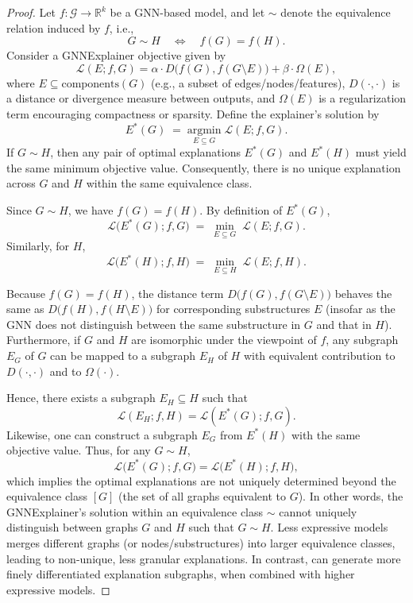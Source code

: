 \begin{proof}
Let $f : \mathcal{G} \to \mathbb{R}^k$ be a GNN-based model, and let $\sim$ denote the equivalence relation induced by $f$, i.e.,
\[
G \sim H \quad \Longleftrightarrow \quad f(G) = f(H).
\]
Consider a GNNExplainer objective given by
\[
\mathcal{L}(E; f, G) = \alpha \cdot D\bigl(f(G), f(G \setminus E)\bigr) + \beta \cdot \Omega(E),
\]
where $E \subseteq \text{components}(G)$ (e.g., a subset of edges/nodes/features), 
$D(\cdot,\cdot)$ is a distance or divergence measure between outputs, 
and $\Omega(E)$ is a regularization term encouraging compactness or sparsity.
Define the explainer's solution by
\[
E^*(G) \;=\; \underset{E \subseteq G}{\mathrm{argmin}}\; \mathcal{L}(E; f, G).
\]
If $G \sim H$, then any pair of optimal explanations $E^*(G)$ and $E^*(H)$ 
must yield the same minimum objective value. Consequently, there is no unique 
explanation across $G$ and $H$ within the same equivalence class.

Since $G \sim H$, we have $f(G) = f(H)$. 
By definition of $E^*(G)$,
\[
\mathcal{L}\bigl(E^*(G); f, G\bigr) \;=\;
\min_{E \subseteq G} \; \mathcal{L}(E; f, G).
\]
Similarly, for $H$,
\[
\mathcal{L}\bigl(E^*(H); f, H\bigr) \;=\;
\min_{E \subseteq H} \; \mathcal{L}(E; f, H).
\]

Because $f(G) = f(H)$, the distance term 
$D\bigl(f(G), f(G \setminus E)\bigr)$ behaves the same as 
$D\bigl(f(H), f(H \setminus E)\bigr)$ for corresponding substructures $E$ 
(insofar as the GNN does not distinguish between the same substructure in $G$ 
and that in $H$). Furthermore, if $G$ and $H$ are isomorphic under the viewpoint 
of $f$, any subgraph $E_G$ of $G$ can be mapped to a subgraph $E_H$ of $H$ with 
equivalent contribution to $D(\cdot,\cdot)$ and to $\Omega(\cdot)$. 

Hence, there exists a subgraph $E_H \subseteq H$ such that
\[
\mathcal{L}(E_H; f, H) = \mathcal{L}(E^*(G); f, G).
\]
Likewise, one can construct a subgraph $E_G$ from $E^*(H)$ with the same objective value. 
Thus, for any $G \sim H$, 
\[
\mathcal{L}\bigl(E^*(G); f, G\bigr) = \mathcal{L}\bigl(E^*(H); f, H\bigr),
\]
which implies the optimal explanations are not uniquely determined 
beyond the equivalence class $[G]$ (the set of all graphs equivalent to $G$). 
In other words, the GNNExplainer's solution within an equivalence class $\sim$ 
cannot uniquely distinguish between graphs $G$ and $H$ such that $G \sim H$. 
Less expressive models 
merges different graphs (or nodes/substructures) into larger equivalence classes, 
leading to non-unique, less granular explanations.
In contrast, 
\explainer can generate more finely differentiated explanation subgraphs, when combined with higher expressive models. 
\qedhere
\end{proof}


